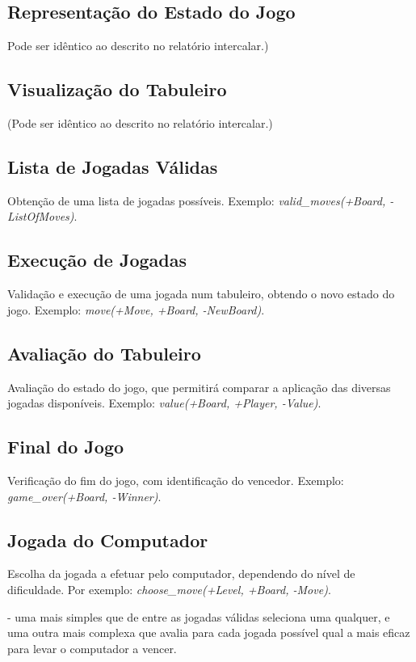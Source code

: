 \documentclass[a4paper]{article}
\begin{document}
\subsection{Representação do Estado do Jogo} Pode ser idêntico ao descrito no relatório intercalar.)

\subsection{Visualização do Tabuleiro} (Pode ser idêntico ao descrito no relatório intercalar.)

\subsection{Lista de Jogadas Válidas} Obtenção de uma lista de jogadas possíveis. Exemplo: \textit{valid\_moves(+Board, -ListOfMoves)}.

\subsection{Execução de Jogadas} Validação e execução de uma jogada num tabuleiro, obtendo o novo estado do jogo. Exemplo: \textit{move(+Move, +Board, -NewBoard)}.

\subsection{Avaliação do Tabuleiro} Avaliação do estado do jogo, que permitirá comparar a aplicação das diversas jogadas disponíveis. Exemplo: \textit{value(+Board, +Player, -Value)}.

\subsection{Final do Jogo} Verificação do fim do jogo, com identificação do vencedor. Exemplo: \textit{game\_over(+Board, -Winner)}.

\subsection{Jogada do Computador} Escolha da jogada a efetuar pelo computador, dependendo do nível de dificuldade. Por exemplo: \textit{choose\_move(+Level, +Board, -Move)}.

- uma mais simples que de entre as jogadas válidas seleciona uma qualquer, e uma outra mais complexa que avalia para cada jogada possível qual a mais eficaz para levar o computador a vencer.
\end{document}
